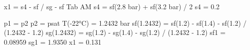 x1 = s4 - sf / sg - sf  
Tab AM  
s4 = sf(2.8 bar) + sf(3.2 bar) / 2  
s4 = 0.2  

p1 = p2  
p2 = psat T(-22°C) = 1.2432 bar  
sf(1.2432) = sf(1.2) - sf(1.4) - sf(1.2) / (1.2432 - 1.2)  
sg(1.2432) = sg(1.2) - sg(1.4) - sg(1.2) / (1.2432 - 1.2)  
sf1 = 0.08959  
sg1 = 1.9350  
x1 = 0.131